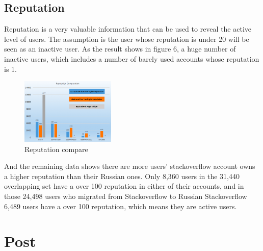 \documentclass[A4paper,twoside,twocolumn]{article}
\begin{document}
\subsection{Reputation}
Reputation is a very valuable information that can be used to reveal the active level of users. The assumption is the user whose reputation is under 20 will be seen as an inactive user. As the result shows in figure 6, a huge number of inactive users, which includes a number of barely used accounts whose reputation is 1. 
	\begin{figure}[H]
		\includegraphics[width = 0.4\textwidth]{user3.png}
		\caption{Reputation compare}
  	\end{figure}
And the remaining data shows there are more users' stackoverflow account owns a higher reputation than their Russian ones. Only 8,360 users in the 31,440 overlapping set have a over 100 reputation in either of their accounts, and in those 24,498 users who migrated from Stackoverflow to Russian Stackoverflow 6,489 users have a over 100 reputation, which means they are active users. 

\section{Post}
\end{document}
